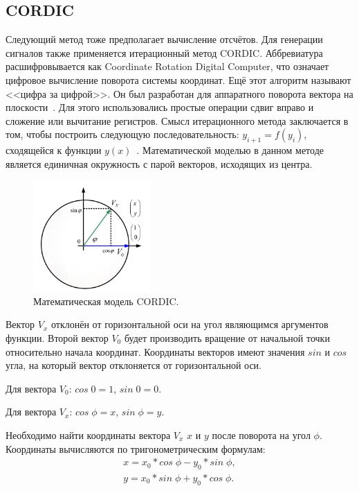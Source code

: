 \subsection{CORDIC}
	Следующий метод тоже предполагает вычисление отсчётов. Для генерации сигналов также применяется итерационный метод CORDIC. 
	Аббревиатура расшифровывается как Coordinate Rotation Digital Computer, что означает цифровое вычисление поворота системы координат. Ещё этот алгоритм называют <<цифра за цифрой>>. Он был разработан для аппаратного поворота вектора на плоскости~\cite{dds_en}. Для этого использовались простые операции сдвиг вправо и сложение или вычитание регистров.
	Смысл итерационного метода заключается в том, чтобы построить следующую последовательность: $y_{i+1}=f(y_{i})$, сходящейся к функции $y(x)$~\cite{cordic}. Математической моделью в данном методе является единичная окружность с парой векторов, исходящих из центра.
	
	\begin{figure}[H]
    \centering
    \includegraphics[width=0.4\textwidth]{../image/cordic.png}
    \caption{Математическая модель CORDIC.}
	\end{figure}

	Вектор $V_{x}$ отклонён от горизонтальной оси на угол являющимся аргументов функции. Второй вектор $V_{0}$ будет производить вращение от начальной точки относительно начала координат. Координаты векторов имеют значения $sin$ и $cos$ угла, на который вектор отклоняется от горизонтальной оси. 

	Для вектора $V_{0}$: $cos\;0 = 1$, $sin\;0 = 0$. 

	Для вектора $V_{x}$: $cos\;\phi = x$, $sin\;\phi = y$.

	Необходимо найти координаты вектора $V_{x}$ $x$ и $y$ после поворота на угол $\phi$. Координаты вычисляются по тригонометрическим формулам:
	\begin{gather}
	x=x_{0}*cos\;\phi-y_{0}*sin\;\phi, \\
	y=x_{0}*sin\;\phi+y_{0}*cos\;\phi. 
	\end{gather}
	
